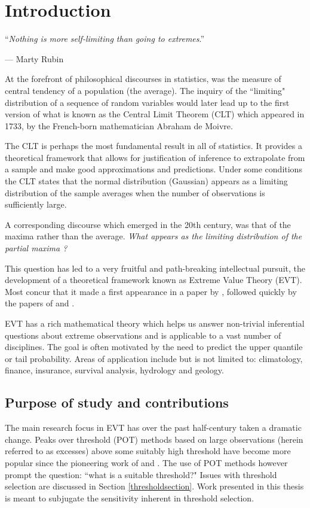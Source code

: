 \setcounter{equation}{0}
\chapter{Introduction}
\epigraphfontsize{\small\itshape}
\epigraph{``\textit{Nothing is more self-limiting than going to extremes}.''}{--- Marty Rubin}
\vspace{2.8cm}
\noindent
At the forefront of philosophical discourses in statistics, was the measure of central tendency of a population (the average). The inquiry of the ``limiting" distribution of a sequence of random variables would later lead up to the first version of what is known as the Central Limit Theorem (CLT) which appeared in 1733, by the French-born mathematician Abraham de Moivre. 

The CLT is perhaps the most fundamental result in all of statistics. It provides a theoretical framework that allows for justification of inference to extrapolate from a sample and make good approximations and predictions. Under some conditions the CLT states that the normal distribution (Gaussian) appears as a limiting distribution of the sample averages when the number of observations is sufficiently large. 

A corresponding discourse which emerged in the 20th century, was that of the maxima rather than the average. {\it What appears as the limiting distribution of the partial maxima ?}

This question has led to a very fruitful and path-breaking intellectual pursuit, the development of a theoretical framework known as Extreme Value Theory (EVT). Most concur that it made a first appearance in a paper by \cite{dodd1923greatest}, followed quickly by the papers of \cite{frechet1927} and \cite{fisher1928limiting}.

EVT has a rich mathematical theory which helps us answer non-trivial inferential questions about extreme observations and is applicable to a vast number of disciplines. The goal is often motivated by the need to predict the upper quantile or tail probability. Areas of application include but is not limited to: climatology, finance, insurance, survival analysis, hydrology and geology.

\section{Purpose of study and contributions}
The main research focus in EVT has over the past half-century taken a dramatic change. Peaks over threshold (POT) methods based on large observations (herein referred to as excesses) above some suitably high threshold have become more popular since the pioneering work of \cite{balkema1974residual} and \cite{pickands1975statistical}. The use of POT methods however prompt the question: ``what is a suitable threshold?" Issues with threshold selection are discussed in Section \ref{thresholdsection}. Work presented in this thesis is meant to subjugate the sensitivity inherent in threshold selection.

